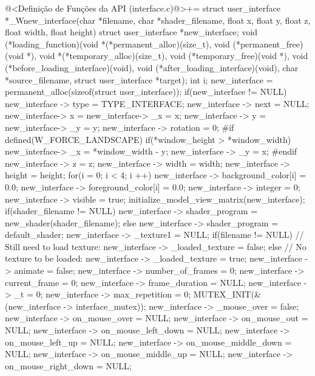 \iniciocodigo
@<Definição de Funções da API (interface.c)@>+=
struct user_interface *_Wnew_interface(char *filename, char *shader_filename,
                                  float x, float y, float z, float width,
                                  float height){
  struct user_interface *new_interface;
  void (*loading_function)(void *(*permanent_alloc)(size_t),
                           void (*permanent_free)(void *),
                           void *(*temporary_alloc)(size_t),
                           void (*temporary_free)(void *),
                           void (*before_loading_interface)(void),
                           void (*after_loading_interface)(void),
                           char *source_filename, struct user_interface *target);
  int i;
  new_interface = permanent_alloc(sizeof(struct user_interface));
  if(new_interface != NULL){
    new_interface -> type = TYPE_INTERFACE;
    new_interface -> next = NULL;
    new_interface-> x = new_interface-> _x = x;
    new_interface -> y = new_interface-> _y = y;
    new_interface -> rotation = 0;
#if defined(W_FORCE_LANDSCAPE)
   if(*window_height > *window_width){
      new_interface-> _x = *window_width - y;
      new_interface -> _y = x;
   }
#endif
    new_interface -> z = z;
    new_interface -> width = width;
    new_interface -> height = height;
    for(i = 0; i < 4; i ++){
      new_interface -> background_color[i] = 0.0;
      new_interface -> foreground_color[i] = 0.0;
    }
    new_interface -> integer = 0;
    new_interface -> visible = true;
    initialize_model_view_matrix(new_interface);
    if(shader_filename != NULL)
      new_interface -> shader_program = new_shader(shader_filename);
    else
      new_interface -> shader_program = default_shader;
    new_interface -> _texture1 = NULL;
    if(filename != NULL) // Still need to load texture:
      new_interface -> _loaded_texture = false;
    else // No texture to be loaded:
      new_interface -> _loaded_texture = true;
    new_interface -> animate = false;
    new_interface -> number_of_frames = 0;
    new_interface -> current_frame = 0;
    new_interface -> frame_duration = NULL;
    new_interface -> _t = 0;
    new_interface -> max_repetition = 0;
    MUTEX_INIT(&(new_interface -> interface_mutex));
    new_interface -> _mouse_over = false;
    new_interface -> on_mouse_over = NULL;
    new_interface -> on_mouse_out = NULL;
    new_interface -> on_mouse_left_down = NULL;
    new_interface -> on_mouse_left_up = NULL;
    new_interface -> on_mouse_middle_down = NULL;
    new_interface -> on_mouse_middle_up = NULL;
    new_interface -> on_mouse_right_down = NULL;
}}
